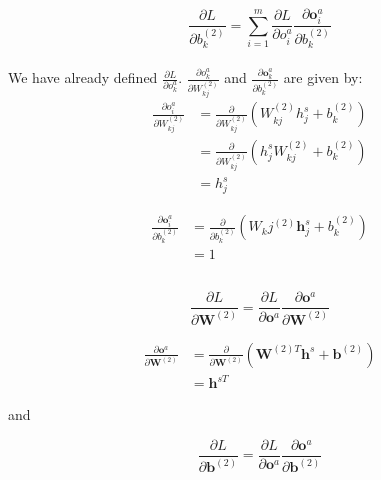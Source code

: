 \documentclass[reqno]{amsart}
\theoremstyle{definition}
\theoremstyle{remark}
\numberwithin{equation}{section}
\begin{document}
\begin{equation}
    \frac{\partial L}{\partial b_k^{(2)}} = \sum_{i=1}^m \frac{\partial L}{\partial o_i^a} \frac{\partial \mathbf{o}_i^a}{\partial b_k^{(2)}}
\end{equation}\\

We have already defined $\frac{\partial L}{\partial o^a_k}$. $\frac{\partial o_k^a}{\partial W_{kj}^{(2)}}$ and $\frac{\partial \mathbf{o}_k^a}{\partial b_k^{(2)}}$ are given by:\\

\begin{align}
    \frac{\partial o_i^a}{\partial W_{kj}^{(2)}} &= \frac{\partial}{\partial W_{kj}^{(2)}}(W_{kj}^{(2)} h^s_j + b_k^{(2)}) \\
    &= \frac{\partial}{\partial W_{kj}^{(2)}} (h^{s}_j W_{kj}^{(2)}+ b_k^{(2)})\\
    &= h^{s}_j
\end{align}

\begin{align}
    \frac{\partial \mathbf{o}_i^a}{\partial b_k^{(2)}} &= \frac{\partial}{\partial b_k^{(2)}} (W_kj^{(2)} \mathbf{h}^s_j + b_k^{(2)}) \\
    &= 1
\end{align}

\subsection{}

\begin{equation}
    \frac{\partial L}{\partial \mathbf{W}^{(2)}} = \frac{\partial L}{\partial \mathbf{o}^a}\frac{\partial \mathbf{o}^a}{\partial \mathbf{W}^{(2)}}
\end{equation}

\begin{align}
    \frac{\partial \mathbf{o}^a}{\partial \mathbf{W}^{(2)}} &= \frac{\partial}{\partial \mathbf{W}^{(2)}} (\mathbf{W}^{(2)T} \mathbf{h}^s + \mathbf{b}^{(2)}) \\
    &= \mathbf{h}^{sT}
\end{align}

and

\begin{equation}
    \frac{\partial L}{\partial \mathbf{b}^{(2)}} = \frac{\partial L}{\partial \mathbf{o}^a}\frac{\partial \mathbf{o}^a}{\partial \mathbf{b}^{(2)}}
\end{equation}
\end{document}
